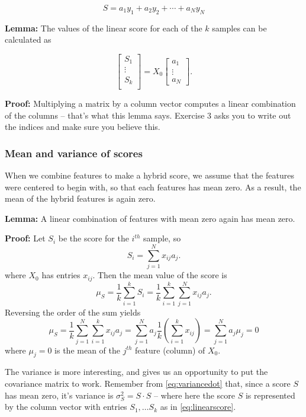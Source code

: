 \documentclass[]{article}
\begin{document}
\[
S = a_{1}y_{1}+a_{2}y_{2}+\cdots+a_{N}y_{N}
\]

\textbf{Lemma:} The values of the linear score for each of the \(k\)
samples can be calculated as

\begin{equation}
\left[\begin{matrix} S_{1} \\ \vdots \\ S_{k}\\ \end{matrix}\right] =
X_{0}\left[
\begin{matrix} a_{1} \\ \vdots \\ a_{N}\end{matrix}\right].
\label{eq:linearscore}\end{equation}

\textbf{Proof:} Multiplying a matrix by a column vector computes a
linear combination of the columns -- that's what this lemma says.
Exercise 3 asks you to write out the indices and make sure you believe
this.

\hypertarget{mean-and-variance-of-scores}{%
\subsubsection{Mean and variance of
scores}\label{mean-and-variance-of-scores}}

When we combine features to make a hybrid score, we assume that the
features were centered to begin with, so that each features has mean
zero. As a result, the mean of the hybrid features is again zero.

\textbf{Lemma:} A linear combination of features with mean zero again
has mean zero.

\textbf{Proof:} Let \(S_{i}\) be the score for the \(i^{th}\) sample, so
\[
S_{i} = \sum_{j=1}^{N} x_{ij}a_{j}.
\] where \(X_{0}\) has entries \(x_{ij}\). Then the mean value of the
score is \[
\mu_{S} = \frac{1}{k}\sum_{i=1}^{k} S_{i} = \frac{1}{k}\sum_{i=1}^{k}\sum_{j=1}^{N} x_{ij}a_{j}.
\] Reversing the order of the sum yields \[
\mu_{S} = \frac{1}{k}\sum_{j=1}^{N}\sum_{i=1}^{k} x_{ij}a_{j} = \sum_{j=1}^{N} a_{j}\frac{1}{k}(\sum_{i=1}^{k} x_{ij})=
\sum_{j=1}^{N}a_{j}\mu_{j}=0
\] where \(\mu_{j}=0\) is the mean of the \(j^{th}\) feature (column) of
\(X_{0}\).

The variance is more interesting, and gives us an opportunity to put the
covariance matrix to work. Remember from \ref{eq:variancedot} that,
since a score \(S\) has mean zero, it's variance is
\(\sigma_{S}^2=S\cdot S\) -- where here the score \(S\) is represented
by the column vector with entries \(S_{1},\ldots S_{k}\) as in
\cref{eq:linearscore}.
\end{document}
